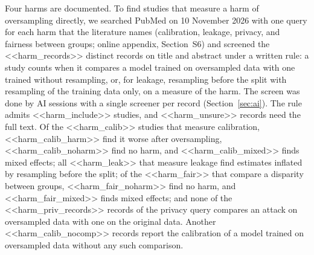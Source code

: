 Four harms are documented. To find studies that measure a harm of oversampling directly, we searched PubMed on 10 November 2026 with one query for each harm that the literature names (calibration, leakage, privacy, and fairness between groups; online appendix, Section~S6) and screened the <<harm_records>> distinct records on title and abstract under a written rule: a study counts when it compares a model trained on oversampled data with one trained without resampling, or, for leakage, resampling before the split with resampling of the training data only, on a measure of the harm. The screen was done by AI sessions with a single screener per record (Section~\ref{sec:ai}). The rule admits <<harm_include>> studies, and <<harm_unsure>> records need the full text. Of the <<harm_calib>> studies that measure calibration, <<harm_calib_harm>> find it worse after oversampling, <<harm_calib_noharm>> find no harm, and <<harm_calib_mixed>> finds mixed effects; all <<harm_leak>> that measure leakage find estimates inflated by resampling before the split; of the <<harm_fair>> that compare a disparity between groups, <<harm_fair_noharm>> find no harm, and <<harm_fair_mixed>> finds mixed effects; and none of the <<harm_priv_records>> records of the privacy query compares an attack on oversampled data with one on the original data. Another <<harm_calib_nocomp>> records report the calibration of a model trained on oversampled data without any such comparison.
